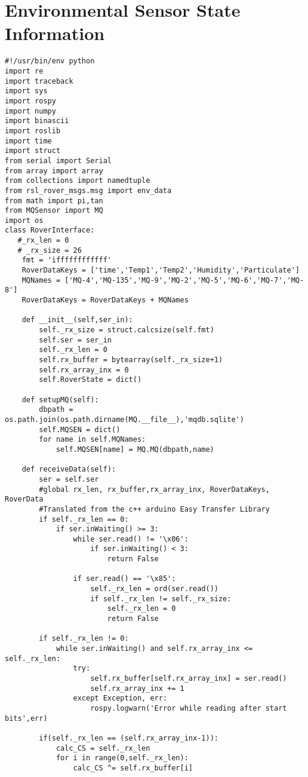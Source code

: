 \section*{Environmental Sensor State Information}
\begin{lstlisting}[breaklines=true,basicstyle=\tiny]
#!/usr/bin/env python
import re
import traceback
import sys
import rospy
import numpy
import binascii
import roslib
import time
import struct
from serial import Serial
from array import array
from collections import namedtuple
from rsl_rover_msgs.msg import env_data
from math import pi,tan
from MQSensor import MQ
import os
class RoverInterface: 
   #_rx_len = 0
   # _rx_size = 26
    fmt = 'iffffffffffff'
    RoverDataKeys = ['time','Temp1','Temp2','Humidity','Particulate']
    MQNames = ['MQ-4','MQ-135','MQ-9','MQ-2','MQ-5','MQ-6','MQ-7','MQ-8']
    RoverDataKeys = RoverDataKeys + MQNames

    def __init__(self,ser_in):
        self._rx_size = struct.calcsize(self.fmt)
        self.ser = ser_in
        self._rx_len = 0
        self.rx_buffer = bytearray(self._rx_size+1)
        self.rx_array_inx = 0
        self.RoverState = dict()

    def setupMQ(self):
        dbpath = os.path.join(os.path.dirname(MQ.__file__),'mqdb.sqlite')
        self.MQSEN = dict()
        for name in self.MQNames:
            self.MQSEN[name] = MQ.MQ(dbpath,name)

    def receiveData(self):
        ser = self.ser
        #global rx_len, rx_buffer,rx_array_inx, RoverDataKeys, RoverData
        #Translated from the c++ arduino Easy Transfer Library
        if self._rx_len == 0:
            if ser.inWaiting() >= 3:
                while ser.read() != '\x06':
                    if ser.inWaiting() < 3:
                        return False

                if ser.read() == '\x85':
                    self._rx_len = ord(ser.read())
                    if self._rx_len != self._rx_size:
                        self._rx_len = 0
                        return False
        
        if self._rx_len != 0:
            while ser.inWaiting() and self.rx_array_inx <= self._rx_len:
                try:
                    self.rx_buffer[self.rx_array_inx] = ser.read()
                    self.rx_array_inx += 1
                except Exception, err:
                    rospy.logwarn('Error while reading after start bits',err)

        if(self._rx_len == (self.rx_array_inx-1)):
            calc_CS = self._rx_len
            for i in range(0,self._rx_len):
                calc_CS ^= self.rx_buffer[i]


\end{lstlisting}
